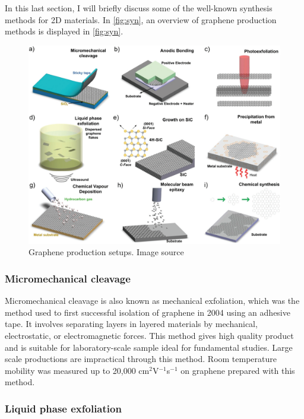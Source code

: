 In this last section, I will briefly discuss some of the well-known synthesis methods for 2D materials. In \autoref{fig:syn}, an overview of graphene production methods is displayed in \autoref{fig:syn}. 

\begin{figure}[htbp!] 
\centering  
\includegraphics[width=\textwidth]{synthesis.png}
\caption{Graphene production setups. Image source \cite{Ferrari2015}}  
\label{fig:syn}
\end{figure} 
\subsubsection{Micromechanical cleavage}

Micromechanical cleavage is also known as mechanical exfoliation, which was the method used to first successful isolation of graphene in 2004 using an adhesive tape\cite{Novoselov26072005}. It involves separating layers in layered materials by mechanical, electrostatic, or electromagnetic forces. This method gives high quality product and is suitable for laboratory-scale sample ideal for fundamental studies. Large scale productions are impractical through this method.  Room temperature mobility was measured up to 20,000 cm$^2$V$^{-1}$s$^{-1}$\cite{Ni2010} on graphene prepared with this method.

\subsubsection{Liquid phase exfoliation}


